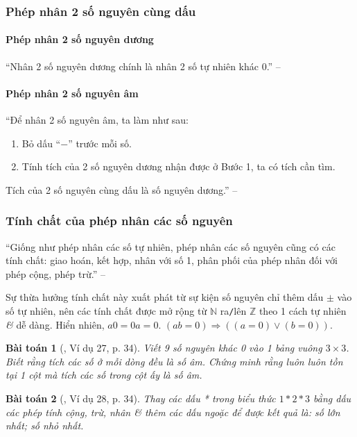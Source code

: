 \documentclass{article}
\numberwithin{equation}{section}
\newtheorem{baitoan}{Bài toán}[section]
\begin{document}
\subsubsection{Phép nhân 2 số nguyên cùng dấu}

\paragraph{Phép nhân 2 số nguyên dương}
``Nhân 2 số nguyên dương chính là nhân 2 số tự nhiên khác 0.'' -- \cite[p. 81]{SGK_Toan_6_Canh_Dieu_tap_1}

\paragraph{Phép nhân 2 số nguyên âm}
``Để nhân 2 số nguyên âm, ta làm như sau:
\begin{enumerate}
	\item Bỏ dấu ``$-$'' trước mỗi số.
	\item Tính tích của 2 số nguyên dương nhận được ở Bước 1, ta có tích cần tìm.
\end{enumerate}
Tích của 2 số nguyên cùng dấu là số nguyên dương.'' -- \cite[p. 81]{SGK_Toan_6_Canh_Dieu_tap_1}

\subsubsection{Tính chất của phép nhân các số nguyên}
``Giống như phép nhân các số tự nhiên, phép nhân các số nguyên cũng có các tính chất: giao hoán, kết hợp, nhân với số 1, phân phối của phép nhân đối với phép cộng, phép trừ.'' -- \cite[p. 82]{SGK_Toan_6_Canh_Dieu_tap_1}

Sự thừa hưởng tính chất này xuất phát từ sự kiện số nguyên chỉ thêm dấu $\pm$ vào số tự nhiên, nên các tính chất được mở rộng từ $\mathbb{N}$ ra\texttt{/}lên $\mathbb{Z}$ theo 1 cách tự nhiên \textit{\&} dễ dàng. Hiển nhiên, $a0 = 0a = 0$. $(ab = 0)\Rightarrow((a = 0)\lor(b = 0))$.

\begin{baitoan}[\cite{Binh_Toan_6_tap_1}, Ví dụ 27, p. 34]
	Viết 9 số nguyên khác 0 vào 1 bảng vuông $3\times 3$. Biết rằng tích các số ở mỗi dòng đều là số âm. Chứng minh rằng luôn luôn tồn tại 1 cột mà tích các số trong cột ấy là số âm.
\end{baitoan}

\begin{baitoan}[\cite{Binh_Toan_6_tap_1}, Ví dụ 28, p. 34]
	Thay các dấu * trong biểu thức $1*2*3$ bằng dấu các phép tính cộng, trừ, nhân \& thêm các dấu ngoặc để được kết quả là: số lớn nhất; số nhỏ nhất.
\end{baitoan}
\end{document}
